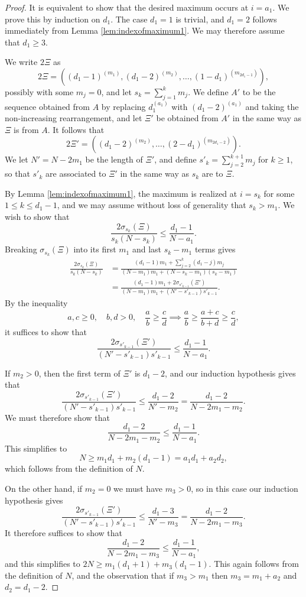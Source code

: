 \documentclass[10pt,a4paper]{amsart}
\newcommand{\f}{\frac}
\begin{document}
\begin{proof}

It is equivalent to show that the desired maximum occurs at $i = a_1$.  We prove this by induction on $d_1$.  The case $d_1 = 1$ is trivial, and $d_1 = 2$ follows immediately from Lemma \ref{lem:indexofmaximum1}.  We may therefore assume that $d_1 \ge 3$.

We write $2\Xi$ as
\[
2\Xi = ((d_1 - 1)^{(m_{1})}, (d_1 - 2)^{(m_{2})}, \dotsc, (1 - d_1)^{(m_{2d_1 - 1} )} ), 
\]
possibly with some $m_j = 0$, and let $s_k = \sum_{j= 1}^k m_j$.  We define $A'$ to be the sequence obtained from $A$ by replacing $d_1^{(a_1)}$ with $(d_1-2)^{(a_1)}$ and taking the non-increasing rearrangement, and let $\Xi'$ be obtained from $A'$ in the same way as $\Xi$ is from $A$.  It follows that
\[
2\Xi' = ((d_1 - 2)^{(m_{2})}, \dotsc, (2 - d_1)^{(m_{2d_1 - 2} )} ).
\]
We let $N' = N - 2m_1$ be the length of $\Xi'$, and define $s'_k = \sum_{j= 2}^{k+1} m_j$ for $k \ge 1$, so that $s'_k$ are associated to $\Xi'$ in the same way as $s_k$ are to $\Xi$.

By Lemma \ref{lem:indexofmaximum1}, the maximum is realized at $i = s_k$ for some $1 \le k \le d_1 - 1$, and we may assume without loss of generality that $s_k > m_1$.  We wish to show that
\[
\f{2\sigma_{s_k}(\Xi)}{s_k(N-s_k)} \le \frac{d_1 - 1}{N - a_1}.
\]
Breaking $\sigma_{s_k}(\Xi)$ into its first $m_1$ and last $s_k - m_1$ terms gives
\begin{align*}
\f{2\sigma_{s_k}(\Xi)}{s_k(N-s_k)} & = \frac{ (d_1-1)m_1 + \sum_{j=2}^k (d_1 - j) m_j }{  (N - m_1)m_1 + (N - s_k - m_1)(s_k - m_1) } \\
& = \frac{ (d_1-1)m_1 + 2\sigma_{s'_{k-1}}(\Xi') }{  (N - m_1)m_1 + (N' - s'_{k-1} )s'_{k-1} }.
\end{align*}
%
By the inequality
\begin{equation} \label{eq: dream function addition}
a,c \geq 0, \quad b,d > 0, \quad \f ab \geq \f cd \implies \f ab \geq \f{a + c}{b+d} \geq \f cd,
\end{equation}
%
it suffices to show that
\[
\frac{ 2\sigma_{s'_{k-1}}(\Xi')}{ (N' - s'_{k-1} )s'_{k-1} } \le \frac{d_1 - 1}{N - a_1}.
\]

If $m_2 > 0$, then the first term of $\Xi'$ is $d_1 - 2$, and our induction hypothesis gives that
\[
\frac{ 2\sigma_{s'_{k-1}}(\Xi')}{ (N' - s'_{k-1} )s'_{k-1} } \le \frac{d_1 - 2}{N' - m_2} = \frac{d_1 - 2}{N - 2m_1 - m_2}.
\]
We must therefore show that
\[
\frac{d_1 - 2}{N - 2m_1 - m_2} \le \frac{d_1 - 1}{N - a_1}.
\]
This simplifies to
\[
N \ge m_1 d_1 + m_2(d_1 - 1) = a_1 d_1 + a_2 d_2,
\]
which follows from the definition of $N$.

On the other hand, if $m_2 = 0$ we must have $m_3 > 0$, so in this case our induction hypothesis gives
\[
\frac{ 2\sigma_{s'_{k-1}}(\Xi')}{ (N' - s'_{k-1} )s'_{k-1} } \le \frac{d_1 - 3}{N' - m_3} = \frac{d_1 - 2}{N - 2m_1 - m_3}.
\]
It therefore suffices to show that
\[
\frac{d_1 - 2}{N - 2m_1 - m_3} \le \frac{d_1 - 1}{N - a_1},
\]
and this simplifies to $2N \ge m_1(d_1+1) + m_3(d_1 - 1)$.  This again follows from the definition of $N$, and the observation that if $m_3 > m_1$ then $m_3 = m_1 + a_2$ and $d_2 = d_1 - 2$.
\end{proof}
\end{document}
